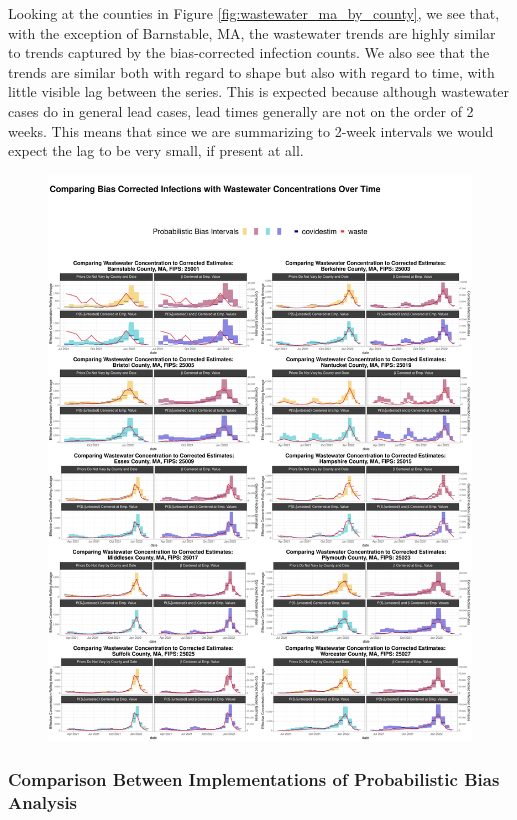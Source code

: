 \documentclass[12pt,twoside]{smiththesis}
\begin{document}
Looking at the counties in Figure \ref{fig:wastewater_ma_by_county}, we see that, with the exception of Barnstable, MA, the wastewater trends are highly similar to trends captured by the bias-corrected infection counts. We also see that the trends are similar both with regard to shape but also with regard to time, with little visible lag between the series. This is expected because although wastewater cases do in general lead cases, lead times generally are not on the order of 2 weeks. This means that since we are summarizing to 2-week intervals we would expect the lag to be very small, if present at all.
\begin{figure}
\includegraphics[width=1\linewidth]{figure/wastewater_ma_by_county} \caption{\label{fig:wastewater_ma_by_county}}\label{fig:unnamed-chunk-88}
\end{figure}
\hypertarget{comparison-between-implementations-of-probabilistic-bias-analysis}{%
\subsubsection{Comparison Between Implementations of Probabilistic Bias Analysis}\label{comparison-between-implementations-of-probabilistic-bias-analysis}}
\end{document}
